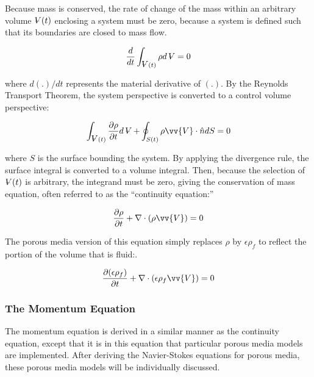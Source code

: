 \documentclass[10pt]{article}
\newcommand{\volume}{\mathop{\ooalign{\hfil$V$\hfil\cr\kern0.08em--\hfil\cr}}\nolimits}
\numberwithin{equation}{section} %
\begin{document}
Because mass is conserved, the rate of change of the mass within an arbitrary volume \(\volume(t)\) enclosing a system must be zero, because a system is defined such that its boundaries are closed to mass flow.

\begin{equation}
\frac{d}{dt} \int_{\volume(t)}^{}\rho d\volume=0
\end{equation}

where \(d(.)/dt\) represents the material derivative of \((.)\). By the Reynolds Transport Theorem, the system perspective is converted to a control volume perspective:

\begin{equation}
\int_{\volume(t)}^{}\frac{\partial\rho}{\partial t}d\volume+\oint_{S(t)}^{}\rho\vv{V}\cdot\hat{n}dS=0
\end{equation}

where \(S\) is the surface bounding the system. By applying the divergence rule, the surface integral is converted to a volume integral. Then, because the selection of \(\volume(t)\) is arbitrary, the integrand must be zero, giving the conservation of mass equation, often referred to as the ``continuity equation:''

\begin{equation}
\label{eq:ContinuityNonPorous}
\frac{\partial\rho}{\partial t} + \nabla\cdot(\rho\vv{V})=0
\end{equation}

The porous media version of this equation simply replaces \(\rho\) by \(\epsilon\rho_f\) to reflect the portion of the volume that is fluid:.

\begin{equation}
\label{eq:ContinuityPorous1}
\begin{aligned}
\frac{\partial (\epsilon\rho_f)}{\partial t} + \nabla\cdot(\epsilon\rho_f\vv{V})=0\\
\end{aligned}
\end{equation}

\subsubsection{The Momentum Equation}

The momentum equation is derived in a similar manner as the continuity equation, except that it is in this equation that particular porous media models are implemented. After deriving the Navier-Stokes equations for porous media, these porous media models will be individually discussed.
\end{document}
